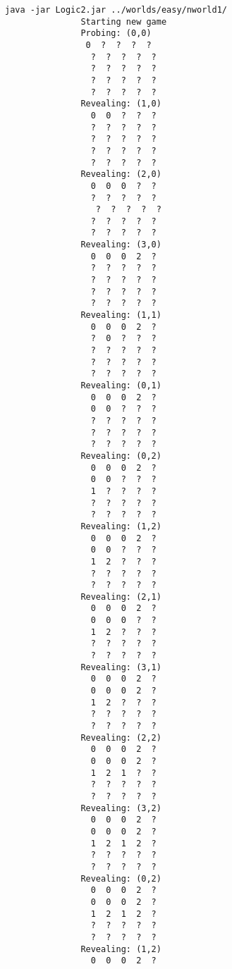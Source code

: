 \documentclass[british]{article}
\begin{document}
\begin{lstlisting}java -jar Logic2.jar ../worlds/easy/nworld1/
               Starting new game
               Probing: (0,0)
                0  ?  ?  ?  ?
                 ?  ?  ?  ?  ?
                 ?  ?  ?  ?  ?
                 ?  ?  ?  ?  ?
                 ?  ?  ?  ?  ?
               Revealing: (1,0)
                 0  0  ?  ?  ?
                 ?  ?  ?  ?  ?
                 ?  ?  ?  ?  ?
                 ?  ?  ?  ?  ?
                 ?  ?  ?  ?  ?
               Revealing: (2,0)
                 0  0  0  ?  ?
                 ?  ?  ?  ?  ?
                  ?  ?  ?  ?  ?
                 ?  ?  ?  ?  ?
                 ?  ?  ?  ?  ?
               Revealing: (3,0)
                 0  0  0  2  ?
                 ?  ?  ?  ?  ?
                 ?  ?  ?  ?  ?
                 ?  ?  ?  ?  ?
                 ?  ?  ?  ?  ?
               Revealing: (1,1)
                 0  0  0  2  ?
                 ?  0  ?  ?  ?
                 ?  ?  ?  ?  ?
                 ?  ?  ?  ?  ?
                 ?  ?  ?  ?  ?
               Revealing: (0,1)
                 0  0  0  2  ?
                 0  0  ?  ?  ?
                 ?  ?  ?  ?  ?
                 ?  ?  ?  ?  ?
                 ?  ?  ?  ?  ?
               Revealing: (0,2)
                 0  0  0  2  ?
                 0  0  ?  ?  ?
                 1  ?  ?  ?  ?
                 ?  ?  ?  ?  ?
                 ?  ?  ?  ?  ?
               Revealing: (1,2)
                 0  0  0  2  ?
                 0  0  ?  ?  ?
                 1  2  ?  ?  ?
                 ?  ?  ?  ?  ?
                 ?  ?  ?  ?  ?
               Revealing: (2,1)
                 0  0  0  2  ?
                 0  0  0  ?  ?
                 1  2  ?  ?  ?
                 ?  ?  ?  ?  ?
                 ?  ?  ?  ?  ?
               Revealing: (3,1)
                 0  0  0  2  ?
                 0  0  0  2  ?
                 1  2  ?  ?  ?
                 ?  ?  ?  ?  ?
                 ?  ?  ?  ?  ?
               Revealing: (2,2)
                 0  0  0  2  ?
                 0  0  0  2  ?
                 1  2  1  ?  ?
                 ?  ?  ?  ?  ?
                 ?  ?  ?  ?  ?
               Revealing: (3,2)
                 0  0  0  2  ?
                 0  0  0  2  ?
                 1  2  1  2  ?
                 ?  ?  ?  ?  ?
                 ?  ?  ?  ?  ?
               Revealing: (0,2)
                 0  0  0  2  ?
                 0  0  0  2  ?
                 1  2  1  2  ?
                 ?  ?  ?  ?  ?
                 ?  ?  ?  ?  ?
               Revealing: (1,2)
                 0  0  0  2  ?

\end{lstlisting}
\end{document}
